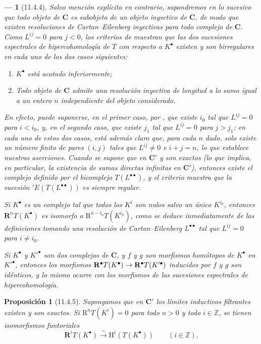 \documentclass[10pt,oneside,openany]{book}
\theoremstyle{egaenv}\newtheorem*{env}{---}
\theoremstyle{egastatement}
\newtheorem*{proposition}{Proposición}
\theoremstyle{egadescription}
\renewcommand{\to}{\mathchoice{\longrightarrow}{\rightarrow}{\rightarrow}{\rightarrow}}
\begin{document}
\begin{env}[11.4.4]
\label{0.11.4.4-fr}
Salvo mención explícita en contrario, supondremos en lo sucesivo que todo objeto de $\boldsymbol{C}$ es subobjeto de un objeto inyectivo de $\boldsymbol{C}$, de modo que existen resoluciones de Cartan--Eilenberg inyectivas para todo complejo de $\boldsymbol{C}$.
Como $L^{ij}=0$ para $j<0$, los criterios de  muestran que las \emph{dos} sucesiones espectrales de hipercohomología de $T$ con respecto a $K^\bullet$ existen y son \emph{birregulares} en cada uno de los dos casos siguientes:
\begin{enumerate}
  \item[$1^\circ$] $K^\bullet$ está acotado inferiormente;
  \item[$2^\circ$] Todo objeto de $\boldsymbol{C}$ admite una resolución inyectiva de longitud a lo sumo igual a un entero $n$ independiente del objeto considerado.
\end{enumerate}
En efecto, puede suponerse, en el primer caso, por , que existe $i_0$ tal que $L^{ij}=0$ para $i<i_0$, y, en el segundo caso, que existe $j_1$ tal que $L^{ij}=0$ para $j>j_1$;
en cada uno de estos dos casos, está además claro que, para cada $n$ dado, solo existe un número finito de pares $(i,j)$ tales que $L^{ij}\neq0$ e $i+j=n$, lo que establece nuestras aserciones. Cuando se supone que en $\boldsymbol{C}'$ y son exactos (lo que implica, en particular, la existencia de sumas directas infinitas en $\boldsymbol{C}'$), entonces existe el complejo definido por el bicomplejo $T(L^{\bullet\bullet})$, y el criterio  muestra que la sucesión $'E(T(L^{\bullet\bullet}))$ es siempre \emph{regular}.

Si $K^\bullet$ es un complejo tal que todos los $K^i$ son nulos salvo un único $K^{i_0}$, entonces
$\mathbf R^nT(K^\bullet)$ es isomorfo a $\mathrm R^{n-i_0}T(K^{i_0})$, como se deduce inmediatamente de las definiciones tomando una resolución de Cartan--Eilenberg $L^{\bullet\bullet}$ tal que $L^{ij}=0$ para $i\neq i_0$.

Si $K^\bullet$ y $K'^\bullet$ son dos complejos de $\boldsymbol{C}$, y $f$ y $g$ son morfismos homótopos de $K^\bullet$ en $K'^\bullet$, entonces los morfismos $\mathbf R^\bullet T(K^\bullet)\to
\mathbf R^\bullet T(K'^\bullet)$ inducidos por $f$ y $g$ son idénticos, y lo mismo ocurre con los morfismos de las sucesiones espectrales de hipercohomología.
\end{env}

\begin{proposition}[11.4.5]
\label{0.11.4.5-fr}
Supongamos que en $\boldsymbol{C}'$ los límites inductivos filtrantes existen y son exactos. Si $\mathrm R^nT(K^i)=0$ para todo $n>0$ y todo $i\in\mathbb Z$, se tienen isomorfismos funtoriales
\[
  \label{0.11.4.5.1-fr}
  \mathbf R^iT(K^\bullet)\xrightarrow{\sim}
  \mathrm H^i(T(K^\bullet))\qquad(i\in\mathbb Z).
  \tag{11.4.5.1}
\]
\end{proposition}
\end{document}
